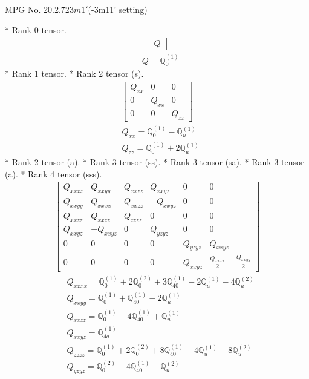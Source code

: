 \documentclass[fleqn,8pt,landscape]{jsarticle}
\begin{document}
\setcounter{MaxMatrixCols}{32}

\renewcommand{\tablename}{Table~}
\renewcommand{\figurename}{Figure~}
\begin{center}
\LARGE
MPG No. 20.2.72\quad$\bar{3}m1'$\quad(-3m11' setting)
\end{center}
* Rank 0 tensor.
\begin{align*}
\begin{bmatrix} Q \end{bmatrix}
\end{align*}
\begin{align*}
& Q = \mathbb{Q}_{0}^{(1)}
\end{align*}
* Rank 1 tensor.
* Rank 2 tensor (s).
\begin{align*}
\begin{bmatrix} Q_{xx} & 0 & 0 \\ 0 & Q_{xx} & 0 \\ 0 & 0 & Q_{zz} \end{bmatrix}
\end{align*}
\begin{align*}
& Q_{xx} = \mathbb{Q}_{0}^{(1)} - \mathbb{Q}_{u}^{(1)} \\
& Q_{zz} = \mathbb{Q}_{0}^{(1)} + 2 \mathbb{Q}_{u}^{(1)}
\end{align*}
* Rank 2 tensor (a).
* Rank 3 tensor (ss).
* Rank 3 tensor (sa).
* Rank 3 tensor (a).
* Rank 4 tensor (sss).
\begin{align*}
\begin{bmatrix} Q_{xxxx} & Q_{xxyy} & Q_{xxzz} & Q_{xxyz} & 0 & 0 \\ Q_{xxyy} & Q_{xxxx} & Q_{xxzz} & - Q_{xxyz} & 0 & 0 \\ Q_{xxzz} & Q_{xxzz} & Q_{zzzz} & 0 & 0 & 0 \\ Q_{xxyz} & - Q_{xxyz} & 0 & Q_{yzyz} & 0 & 0 \\ 0 & 0 & 0 & 0 & Q_{yzyz} & Q_{xxyz} \\ 0 & 0 & 0 & 0 & Q_{xxyz} & \frac{Q_{xxxx}}{2} - \frac{Q_{xxyy}}{2} \end{bmatrix}
\end{align*}
\begin{align*}
& Q_{xxxx} = \mathbb{Q}_{0}^{(1)} + 2 \mathbb{Q}_{0}^{(2)} + 3 \mathbb{Q}_{40}^{(1)} - 2 \mathbb{Q}_{u}^{(1)} - 4 \mathbb{Q}_{u}^{(2)} \\
& Q_{xxyy} = \mathbb{Q}_{0}^{(1)} + \mathbb{Q}_{40}^{(1)} - 2 \mathbb{Q}_{u}^{(1)} \\
& Q_{xxzz} = \mathbb{Q}_{0}^{(1)} - 4 \mathbb{Q}_{40}^{(1)} + \mathbb{Q}_{u}^{(1)} \\
& Q_{xxyz} = \mathbb{Q}_{4a}^{(1)} \\
& Q_{zzzz} = \mathbb{Q}_{0}^{(1)} + 2 \mathbb{Q}_{0}^{(2)} + 8 \mathbb{Q}_{40}^{(1)} + 4 \mathbb{Q}_{u}^{(1)} + 8 \mathbb{Q}_{u}^{(2)} \\
& Q_{yzyz} = \mathbb{Q}_{0}^{(2)} - 4 \mathbb{Q}_{40}^{(1)} + \mathbb{Q}_{u}^{(2)}
\end{align*}
\end{document}

